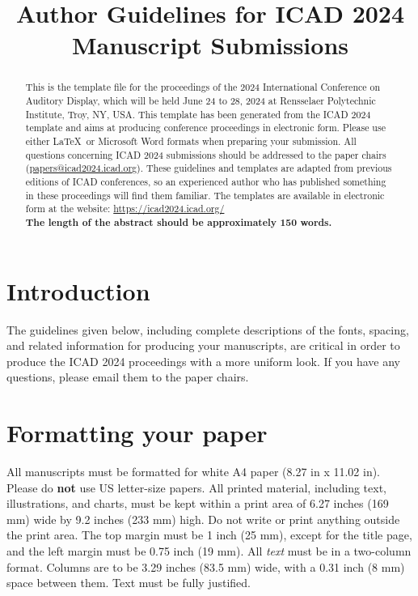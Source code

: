 \documentclass[a4paper,10pt,oneside]{article}
\title{Author Guidelines for ICAD 2024 Manuscript Submissions}
\begin{document}
\ninept
\maketitle
\begin{sloppy}
\begin{abstract}
This is the template file for the proceedings of the 2024 International Conference on Auditory Display, which will be held June 24 to 28, 2024 at Rensselaer Polytechnic Institute, Troy, NY, USA. This template has been generated from the ICAD 2024 template and aims at producing conference proceedings in electronic form. Please use either \LaTeX\ or Microsoft Word formats when preparing your submission. All questions concerning ICAD 2024 submissions should be addressed to the paper chairs (\href{mailto:papers@icad2024.icad.org}{papers@icad2024.icad.org}). These guidelines and templates are adapted from previous editions of ICAD conferences, so an experienced author who has published something in these proceedings will find them familiar. The templates are available in electronic form at the website: \url{https://icad2024.icad.org/}\\
\bf{The length of the abstract should be approximately 150 words.}
\end{abstract}

\section{Introduction}
\label{sec:intro}

The guidelines given below, including complete descriptions of the fonts, spacing, and related information for producing your manuscripts, are critical in order to produce the ICAD 2024 proceedings with a more uniform look. If you have any questions, please email them to the paper chairs.

\section{Formatting your paper}
\label{sec:format}

All manuscripts must be formatted for white A4 paper (8.27 in x 11.02 in). Please do \textbf{not} use US letter-size papers. All printed material, including text, illustrations, and charts, must be kept within a print area of 6.27 inches (169 mm) wide by 9.2 inches (233 mm) high. Do not write or print anything outside the print area. The top margin must be 1 inch (25 mm), except for the title page, and the left margin must be 0.75 inch (19 mm). All \textit{text} must be in a two-column format. Columns are to be 3.29 inches (83.5 mm) wide, with a 0.31 inch (8 mm) space between them. Text must be fully justified.


\end{sloppy}
\end{document}
